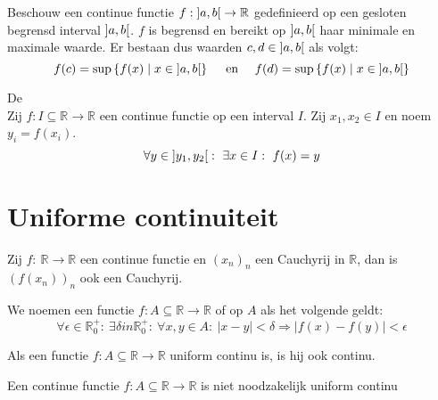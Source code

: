 \documentclass[main.tex]{subfiles}
\begin{document}
\begin{st}
  Beschouw een continue functie $f: \interval[open]{a}{b} \rightarrow \mathbb{R}$ gedefinieerd op een gesloten begrensd interval $\interval[open]{a}{b}$.
  $f$ is begrensd en bereikt op $\interval[open]{a}{b}$ haar minimale en maximale waarde.
  Er bestaan dus waarden $c,d \in \interval[open]{a}{b}$ als volgt:
  \[ f(c) = \sup\left\{ f(x) \mid x \in \interval[open]{a}{b} \right\} \quad\text{ en }\quad f(d) = \sup\left\{ f(x) \mid x \in \interval[open]{a}{b} \right\} \]
\end{st}

\begin{st}
  \label{st:tussenwaardestelling}
  De \\
  Zij $f: I \subseteq \mathbb{R} \rightarrow \mathbb{R}$ een continue functie op een interval $I$.
  Zij $x_{1},x_{2}\in I$ en noem $y_{i}=f(x_{i})$.
  \[ \forall y \in \interval[open]{y_{1}}{y_{2}}:\ \exists x \in I:\ f(x) = y \]
\end{st}


\section{Uniforme continuiteit}
\label{sec:unif-cont}

\begin{st}
  Zij $f:\ \mathbb{R} \rightarrow \mathbb{R}$ een continue functie en $(x_{n})_{n}$ een Cauchyrij in $\mathbb{R}$, dan is $(f(x_{n}))_{n}$ ook een Cauchyrij.
\end{st}

\begin{de}
  We noemen een functie $f: A \subseteq \mathbb{R} \rightarrow \mathbb{R}$  of  op $A$ als het volgende geldt:
  \[ \forall \epsilon \in \mathbb{R}_{0}^{+}:\ \exists \delta in \mathbb{R}_{0}^{+}:\ \forall x,y \in A:\ |x-y| < \delta \Rightarrow |f(x)-f(y)| < \epsilon \]
\end{de}

\begin{st}
  Als een functie $f: A \subseteq \mathbb{R} \rightarrow \mathbb{R}$ uniform continu is, is hij ook continu.
\end{st}

\begin{tvb}
  Een continue functie $f: A \subseteq \mathbb{R} \rightarrow \mathbb{R}$ is niet noodzakelijk uniform continu
\end{tvb}
\end{document}
